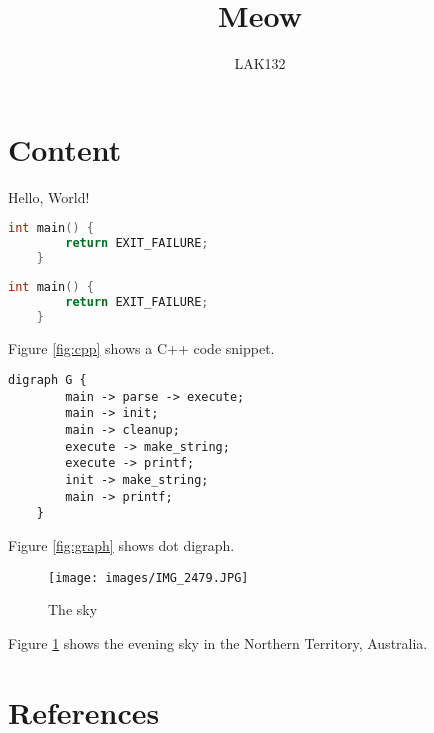 \documentclass{article}
\title{Meow}
\author{LAK132}
\begin{document}
\maketitle
\tableofcontents

\section[content]{Content}

Hello, World!

\cite{LAK132}

\begin{lstlisting}[language=cpp]
	int main() {
		return EXIT_FAILURE;
	}
\end{lstlisting}

\begin{lstlisting}[label={fig:cpp}, caption={A C++ snippet.}, language=cpp]
	int main() {
		return EXIT_FAILURE;
	}
\end{lstlisting}
Figure \ref{fig:cpp} shows a C++ code snippet.

\begin{lstlisting}[label={fig:graph}, caption={A dot graph.}, language=dot-image]
	digraph G {
		main -> parse -> execute;
		main -> init;
		main -> cleanup;
		execute -> make_string;
		execute -> printf;
		init -> make_string;
		main -> printf;
	}
\end{lstlisting}
Figure \ref{fig:graph} shows dot digraph.

\begin{figure}
	\caption{The sky}
	\label{fig:sky}
	\texttt{[image: images/IMG\_2479.JPG]}
\end{figure}
Figure \ref{fig:sky} shows the evening sky in the Northern Territory, Australia.

\newpage

\section[references]{References}



\end{document}
